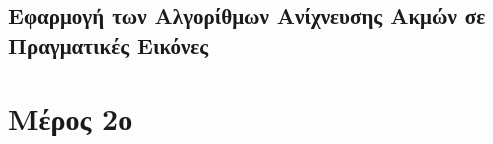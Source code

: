 \documentclass{article}
\begin{document}
\subsection{Εφαρμογή των Αλγορίθμων Ανίχνευσης Ακμών σε Πραγματικές Εικόνες}

\section{Μέρος 2ο}
\end{document}

